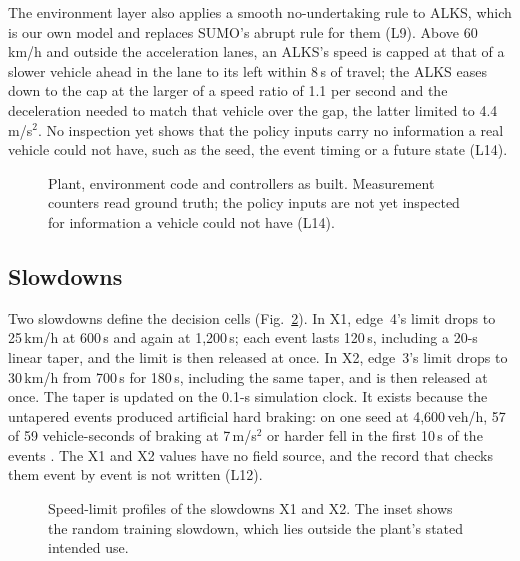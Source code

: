 The environment layer also applies a smooth no-undertaking rule to ALKS, which is our own model and replaces SUMO's abrupt rule for them (L9).
Above 60\,km/h and outside the acceleration lanes, an ALKS's speed is capped at that of a slower vehicle ahead in the lane to its left within 8\,s of travel; the ALKS eases down to the cap at the larger of a speed ratio of 1.1 per second and the deceleration needed to match that vehicle over the gap, the latter limited to 4.4\,m/s$^2$.
No inspection yet shows that the policy inputs carry no information a real vehicle could not have, such as the seed, the event timing or a future state (L14).

\begin{figure}[tbp]
\centering
{}
\caption{Plant, environment code and controllers as built. Measurement counters read ground truth; the policy inputs are not yet inspected for information a vehicle could not have (L14).}\label{fig:boundary}
\end{figure}

\subsection{Slowdowns}\label{sec:slowdowns}

Two slowdowns define the decision cells (Fig.~\ref{fig:slowdowns}).
In X1, edge~4's limit drops to 25\,km/h at 600\,s and again at 1,200\,s; each event lasts 120\,s, including a 20-s linear taper, and the limit is then released at once.
In X2, edge~3's limit drops to 30\,km/h from 700\,s for 180\,s, including the same taper, and is then released at once.
The taper is updated on the 0.1-s simulation clock.
It exists because the untapered events produced artificial hard braking: on one seed at 4,600\,veh/h, 57 of 59 vehicle-seconds of braking at 7\,m/s$^2$ or harder fell in the first 10\,s of the events .
The X1 and X2 values have no field source, and the record that checks them event by event is not written (L12).

\begin{figure}[tbp]
\centering
{}
\caption{Speed-limit profiles of the slowdowns X1 and X2. The inset shows the random training slowdown, which lies outside the plant's stated intended use.}\label{fig:slowdowns}
\end{figure}

